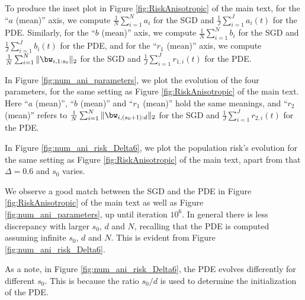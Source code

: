 \documentclass[11pt]{article}
\begin{document}
To produce the inset plot in Figure \ref{fig:RiskAnisotropic} of the main text, for the ``$a$ (mean)'' axis, we compute $\frac{1}{N}\sum_{i=1}^Na_i$ for the SGD and $\frac{1}{J}\sum_{i=1}^Ja_i(t)$ for the PDE. Similarly, for the ``$b$ (mean)'' axis, we compute $\frac{1}{N}\sum_{i=1}^Nb_i$ for the SGD and $\frac{1}{J}\sum_{i=1}^Jb_i(t)$ for the PDE, and for the ``$r_1$ (mean)'' axis, we compute $\frac{1}{N}\sum_{i=1}^N\Vert\bw_{i,1:s_0}\Vert_2$ for the SGD and $\frac{1}{J}\sum_{i=1}^Jr_{1,i}(t)$ for the PDE.

 In Figure \ref{fig:num_ani_parameters}, we plot the evolution of the four parameters, for the same setting as Figure \ref{fig:RiskAnisotropic} of the main text. Here ``$a$ (mean)'', ``$b$ (mean)'' and ``$r_1$ (mean)'' hold the same meanings, and ``$r_2$ (mean)'' refers to $\frac{1}{N}\sum_{i=1}^N\Vert\bw_{i,(s_0+1):d}\Vert_2$ for the SGD and $\frac{1}{J}\sum_{i=1}^Jr_{2,i}(t)$ for the PDE.

In Figure \ref{fig:num_ani_risk_Delta6}, we plot the population risk's evolution for the same setting as Figure \ref{fig:RiskAnisotropic} of the main text, apart from that $\Delta=0.6$ and $s_0$ varies.

 We observe a good match between the SGD and the PDE in Figure \ref{fig:RiskAnisotropic} of the main text as well as Figure \ref{fig:num_ani_parameters}, up until iteration $10^6$. In general there is less discrepancy with larger $s_0$, $d$ and $N$, recalling that the PDE is computed assuming infinite $s_0$, $d$ and $N$. This is evident from Figure \ref{fig:num_ani_risk_Delta6}.

As a note, in Figure \ref{fig:num_ani_risk_Delta6}, the PDE evolves differently for different $s_0$. This is because the ratio $s_0/d$ is used to determine the initialization of the PDE.
\end{document}
